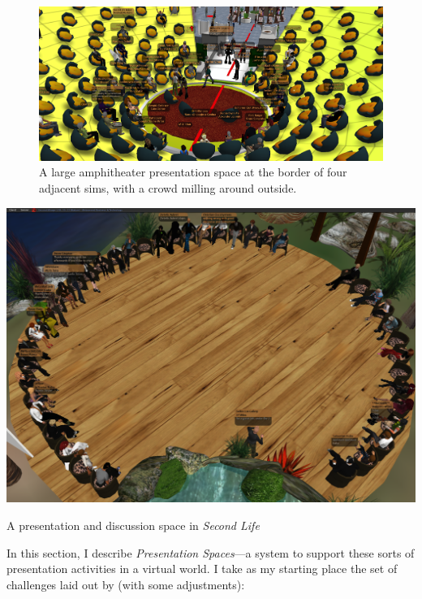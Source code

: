 \begin{figure}[t]
	\includegraphics{figures/presentation_1.png}
	\caption{A large amphitheater presentation space at the border of four adjacent sims, with a crowd milling around outside.}
	\label{fig:amphitheater_presentation}
\end{figure}

\begin{marginfigure}
	\includegraphics{figures/presentation_2.png}
	\caption{A presentation and discussion space in \emph{Second Life}}
	\label{fig:circle_presentation}
\end{marginfigure}

In this section, I describe \emph{Presentation Spaces}---a system to support these sorts of presentation activities in a virtual world. I take as my starting place the set of challenges laid out by \citet{Yankelovich:2008vk} (with some adjustments):

